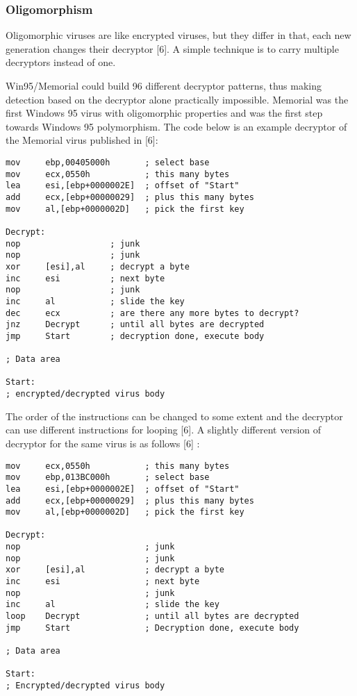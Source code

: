 \subsubsection{Oligomorphism}
Oligomorphic viruses are like encrypted viruses, but they differ in that, each new generation changes their decryptor [6]. A simple technique is to carry multiple decryptors instead of one. 

Win95/Memorial could build 96 different decryptor patterns, thus making detection based on the decryptor alone practically impossible. Memorial was the first Windows 95 virus with oligomorphic properties and was the first step towards Windows 95 polymorphism. The code below is an example decryptor of the Memorial virus published in [6]:

\begin{verbatim}
mov     ebp,00405000h       ; select base
mov     ecx,0550h           ; this many bytes
lea     esi,[ebp+0000002E]  ; offset of "Start"
add     ecx,[ebp+00000029]  ; plus this many bytes
mov     al,[ebp+0000002D]   ; pick the first key

Decrypt:
nop                  ; junk
nop                  ; junk
xor     [esi],al     ; decrypt a byte
inc     esi          ; next byte
nop                  ; junk
inc     al           ; slide the key
dec     ecx          ; are there any more bytes to decrypt?
jnz     Decrypt      ; until all bytes are decrypted
jmp     Start        ; decryption done, execute body

; Data area

Start:
; encrypted/decrypted virus body

\end{verbatim}

The order of the instructions can be changed to some extent and the decryptor can use different instructions for looping [6]. A slightly different version of decryptor for the same virus is as follows [6] :
\begin{verbatim}
mov     ecx,0550h           ; this many bytes
mov     ebp,013BC000h       ; select base
lea     esi,[ebp+0000002E]  ; offset of "Start"
add     ecx,[ebp+00000029]  ; plus this many bytes
mov     al,[ebp+0000002D]   ; pick the first key

Decrypt:
nop                         ; junk
nop                         ; junk
xor     [esi],al            ; decrypt a byte
inc     esi                 ; next byte
nop                         ; junk
inc     al                  ; slide the key
loop    Decrypt             ; until all bytes are decrypted
jmp     Start               ; Decryption done, execute body
					
; Data area

Start:
; Encrypted/decrypted virus body
\end{verbatim}

